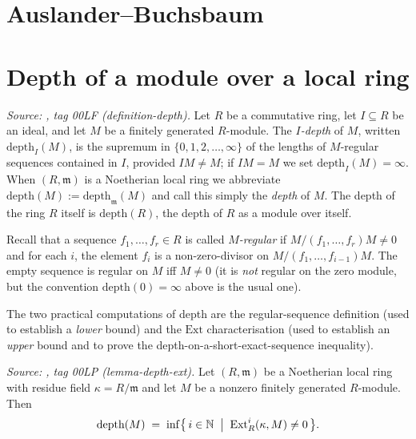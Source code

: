 \section{Auslander--Buchsbaum}
\label{mk-chap:Albanese_AuslanderBuchsbaum}


\section{Depth of a module over a local ring}
\label{mk-sec:ab_depth}

\begin{definition}\label{mk-def:depth}
  \leanok

  \textit{Source: \cite{stacks-project}, tag 00LF (definition-depth).}
  Let \(R\) be a commutative ring, let \(I \subseteq R\) be an ideal, and let \(M\) be a finitely
  generated \(R\)-module. The \emph{\(I\)-depth} of \(M\), written \(\text{depth}_I(M)\), is the
  supremum in \(\{0, 1, 2, \dots, \infty\}\) of the lengths of \(M\)-regular sequences contained
  in \(I\), provided \(IM \neq M\); if \(IM = M\) we set \(\text{depth}_I(M) = \infty\). When
  \((R, \mathfrak{m})\) is a Noetherian local ring we abbreviate
  \(\text{depth}(M) := \text{depth}_{\mathfrak{m}}(M)\) and call this simply the
  \emph{depth} of \(M\). The depth of the ring \(R\) itself is \(\text{depth}(R)\), the depth
  of \(R\) as a module over itself.
\end{definition}

Recall that a sequence \(f_1, \dots, f_r \in R\) is called \emph{\(M\)-regular} if
\(M/(f_1, \dots, f_r)M \neq 0\) and for each \(i\), the element \(f_i\) is a non-zero-divisor on
\(M/(f_1, \dots, f_{i-1})M\). The empty sequence is regular on \(M\) iff \(M \neq 0\) (it is
\emph{not} regular on the zero module, but the convention \(\text{depth}(0) = \infty\)
above is the usual one).

The two practical computations of depth are the regular-sequence definition (used to
establish a \emph{lower} bound) and the \(\text{Ext}\) characterisation (used to establish an
\emph{upper} bound and to prove the depth-on-a-short-exact-sequence inequality).

\begin{lemma}\label{mk-lem:depth_via_ext}
  \leanok


  \textit{Source: \cite{stacks-project}, tag 00LP (lemma-depth-ext).}
  Let \((R, \mathfrak{m})\) be a Noetherian local ring with residue field
  \(\kappa = R/\mathfrak{m}\) and let \(M\) be a nonzero finitely generated \(R\)-module. Then
  \[
    \text{depth}(M) \;=\; \inf\bigl\{\, i \in \mathbb{N} \;\bigm|\; \text{Ext}^i_R(\kappa, M) \neq 0 \,\bigr\}.
  \]
\end{lemma}

